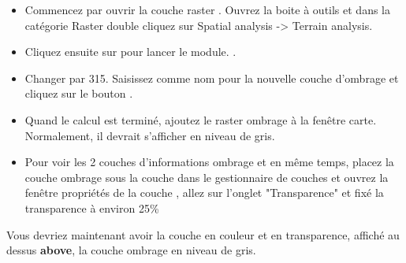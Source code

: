 \begin{itemize}[label=--]
\item Commencez par ouvrir la couche raster . Ouvrez la boite à outils \grass et dans la catégorie Raster double cliquez sur Spatial
analysis -> Terrain analysis.
\item Cliquez ensuite sur  pour lancer le module.
. 
\item Changer  par 315. Saisissez  comme nom pour la nouvelle couche d'ombrage et cliquez sur le bouton .

\item Quand le calcul est terminé, ajoutez le raster ombrage à la fenêtre carte. Normalement, il devrait s'afficher en niveau de gris.
\item Pour voir les 2 couches d'informations ombrage et  en même temps, placez la couche ombrage sous la couche  dans le gestionnaire de couches et ouvrez la fenêtre propriétés de la couche , allez sur l'onglet "Transparence" et fixé la transparence à environ 25\%
\end{itemize}

Vous devriez maintenant avoir la couche  en couleur et en transparence, affiché au dessus \textbf{above}, la couche ombrage en niveau de gris.

